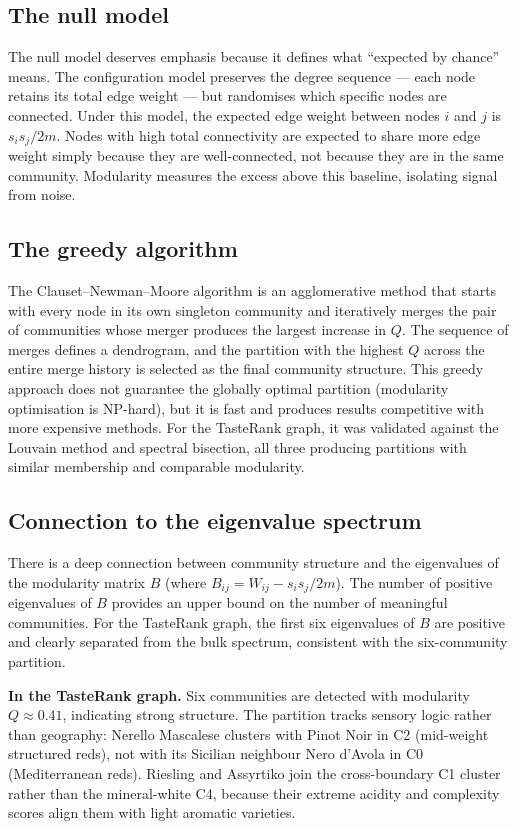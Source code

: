 \documentclass[11pt]{article}
\begin{document}
\subsection{The null model}
The null model deserves emphasis because it defines what ``expected by chance'' means. The configuration model preserves the degree sequence --- each node retains its total edge weight --- but randomises which specific nodes are connected. Under this model, the expected edge weight between nodes $i$ and $j$ is $s_i s_j / 2m$. Nodes with high total connectivity are expected to share more edge weight simply because they are well-connected, not because they are in the same community. Modularity measures the excess above this baseline, isolating signal from noise.

\subsection{The greedy algorithm}
The Clauset--Newman--Moore algorithm is an agglomerative method that starts with every node in its own singleton community and iteratively merges the pair of communities whose merger produces the largest increase in $Q$. The sequence of merges defines a dendrogram, and the partition with the highest $Q$ across the entire merge history is selected as the final community structure. This greedy approach does not guarantee the globally optimal partition (modularity optimisation is NP-hard), but it is fast and produces results competitive with more expensive methods. For the TasteRank graph, it was validated against the Louvain method and spectral bisection, all three producing partitions with similar membership and comparable modularity.

\subsection{Connection to the eigenvalue spectrum}
There is a deep connection between community structure and the eigenvalues of the modularity matrix $B$ (where $B_{ij} = W_{ij} - s_i s_j / 2m$). The number of positive eigenvalues of $B$ provides an upper bound on the number of meaningful communities. For the TasteRank graph, the first six eigenvalues of $B$ are positive and clearly separated from the bulk spectrum, consistent with the six-community partition.

\textbf{In the TasteRank graph.} Six communities are detected with modularity $Q \approx 0.41$, indicating strong structure. The partition tracks sensory logic rather than geography: Nerello Mascalese clusters with Pinot Noir in C2 (mid-weight structured reds), not with its Sicilian neighbour Nero d'Avola in C0 (Mediterranean reds). Riesling and Assyrtiko join the cross-boundary C1 cluster rather than the mineral-white C4, because their extreme acidity and complexity scores align them with light aromatic varieties.
\end{document}
